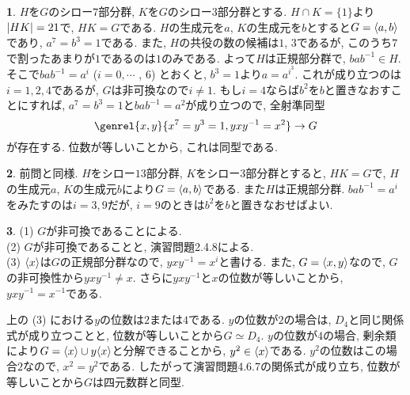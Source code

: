 \documentclass{article}
\theoremstyle{definition}
\newtheorem{ans}{}
\numberwithin{ans}{subsection}
\DeclarePairedDelimiter{\gen}{\langle}{\rangle}
\DeclarePairedDelimiter{\order}{\lvert}{\rvert}
\begin{document}
\begin{ans}
  $H$を$G$のシロー$7$部分群, $K$を$G$のシロー$3$部分群とする.
  $H \cap K = \{1\}$より$\order{HK} = 21$で, $HK = G$である.
  $H$の生成元を$a$, $K$の生成元を$b$とすると$G = \gen{a, b}$であり,
  $a^7 = b^3 = 1$である.
  また, $H$の共役の数の候補は$1$, $3$であるが, このうち$7$で割ったあまりが$1$であるのは$1$のみである.
  よって$H$は正規部分群で, $bab^{-1} \in H$.
  そこで$bab^{-1} = a^i$ ($i = 0, \cdots$ , 6) とおくと, $b^3 = 1$より$a = a^{i^3}$.
  これが成り立つのは$i = 1, 2, 4$であるが, $G$は非可換なので$i \neq 1$.
  もし$i = 4$ならば$b^2$を$b$と置きなおすことにすれば,
  $a^7 = b^3 = 1$と$bab^{-1} = a^2$が成り立つので, 全射準同型
  \[
    \genrel{x, y}{x^7 = y^3 = 1, yxy^{-1} = x^2} \rightarrow G
  \]
  が存在する. 位数が等しいことから, これは同型である.
\end{ans}

\begin{ans}
  前問と同様. $H$をシロー$13$部分群, $K$をシロー$3$部分群とすると, $HK = G$で,
  $H$の生成元$a$, $K$の生成元$b$により$G = \gen{a, b}$である.
  また$H$は正規部分群.
  $bab^{-1} = a^i$をみたすのは$i = 3, 9$だが, $i = 9$のときは$b^2$を$b$と置きなおせばよい.
\end{ans}

\begin{ans}
  (1) $G$が非可換であることによる.\\
  (2) $G$が非可換であることと, 演習問題2.4.8による.\\
  (3) $\gen{x}$は$G$の正規部分群なので, $yxy^{-1} = x^i$と書ける.
  また, $G = \gen{x, y}$なので, $G$の非可換性から$yxy^{-1} \neq x$.
  さらに$yxy^{-1}$と$x$の位数が等しいことから, $yxy^{-1} = x^{-1}$である.

  上の (3) における$y$の位数は$2$または$4$である.
  $y$の位数が$2$の場合は, $D_4$と同じ関係式が成り立つことと, 位数が等しいことから$G \simeq D_4$.
  $y$の位数が$4$の場合, 剰余類により$G = \gen{x} \cup y\gen{x}$と分解できることから, $y^2 \in \gen{x}$である.
  $y^2$の位数はこの場合$2$なので, $x^2 = y^2$である. したがって演習問題4.6.7の関係式が成り立ち, 位数が等しいことから$G$は四元数群と同型.
\end{ans}
\end{document}
